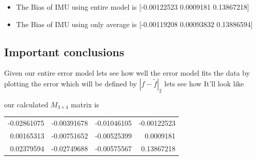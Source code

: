 \documentclass[11pt]{article}
\begin{document}
\begin{itemize}
\item The Bias of IMU using entire model  is 
{[}-0.00122523  0.0009181   0.13867218]
\item The Bias of IMU using only average is
{[}-0.00119208  0.00093832  0.13886594]
\end{itemize}
\subsection{Important conclusions}
\label{sec:orge1ed01e}
Given our entire error model lets see how well the error model fits the data by plotting the error which will be defined by \(|f - \tilde{f}|_2\) lets see how It'll look like 


our calculated \(M_{3\times 4}\) matrix is 
\begin{table}[htbp]
\label{M}
\centering
\begin{tabular}{rrrr}
-0.02861075 & -0.00391678 & -0.01046105 & -0.00122523\\
0.00165313 & -0.00751652 & -0.00525399 & 0.0009181\\
0.02379594 & -0.02749688 & -0.00575567 & 0.13867218\\
\end{tabular}
\end{table}
\end{document}
